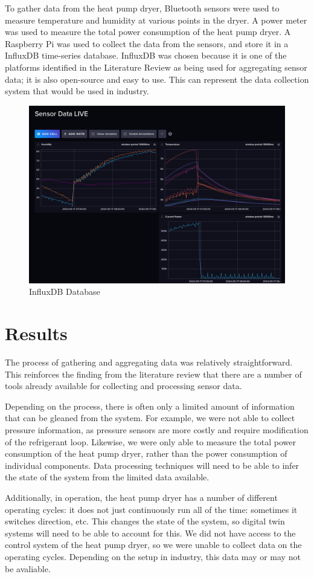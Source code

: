 To gather data from the heat pump dryer, Bluetooth sensors were used to measure temperature and humidity at various points in the dryer. 
A power meter was used to measure the total power consumption of the heat pump dryer. 
A Raspberry Pi was used to collect the data from the sensors, and store it in a InfluxDB time-series database. 
InfluxDB was chosen because it is one of the platforms identified in the Literature Review as being used for aggregating sensor data; it is also open-source and easy to use. 
This can represent the data collection system that would be used in industry.


\begin{figure}
    \centering
    \includegraphics[width=\textwidth]{influxdb.png}
    \caption{InfluxDB Database}
    \label{fig:influxdb}
\end{figure}

\section{Results}

The process of gathering and aggregating data was relatively straightforward. 
This reinforces the finding from the literature review that there are a number of tools already available for collecting and processing sensor data. 

Depending on the process, there is often only a limited amount of information that can be gleaned from the system. 
For example, we were not able to collect pressure information, as pressure sensors are more costly and require modification of the refrigerant loop. 
Likewise, we were only able to measure the total power consumption of the heat pump dryer, rather than the power consumption of individual components. 
Data processing techniques will need to be able to infer the state of the system from the limited data available.

Additionally, in operation, the heat pump dryer has a number of different operating cycles: it does not just continuously run all of the time: sometimes it switches direction, etc. 
This changes the state of the system, so digital twin systems will need to be able to account for this. 
We did not have access to the control system of the heat pump dryer, so we were unable to collect data on the operating cycles. 
Depending on the setup in industry, this data may or may not be avaliable.
